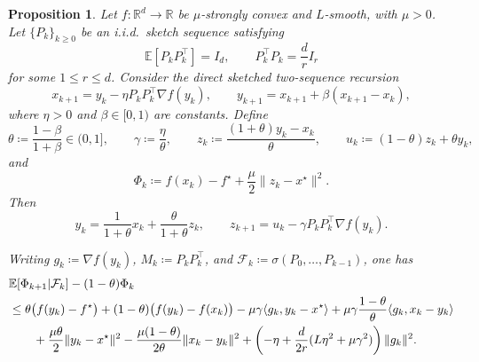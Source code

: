 \documentclass[10pt,a4paper]{amsart}
\newtheorem{proposition}{Proposition}
\begin{document}
\begin{proposition}
\label{prop:strong-two-seq-obstruction-collapse}
Let \(f:\mathbb{R}^d\to\mathbb{R}\) be \(\mu\)-strongly convex and \(L\)-smooth, with \(\mu>0\).
Let \(\{P_k\}_{k\ge 0}\) be an i.i.d.\ sketch sequence satisfying
\[
\mathbb{E}[P_kP_k^\top]=I_d,
\qquad
P_k^\top P_k=\frac{d}{r}I_r
\]
for some \(1\le r\le d\).
Consider the direct sketched two-sequence recursion
\begin{equation}
x_{k+1}=y_k-\eta P_kP_k^\top \nabla f(y_k),
\qquad
y_{k+1}=x_{k+1}+\beta(x_{k+1}-x_k),
\label{eq:strong-direct-two-seq-collapse}
\end{equation}
where \(\eta>0\) and \(\beta\in[0,1)\) are constants. Define
\[
\theta\coloneqq \frac{1-\beta}{1+\beta}\in(0,1],
\qquad
\gamma\coloneqq \frac{\eta}{\theta},
\qquad
z_k\coloneqq \frac{(1+\theta)y_k-x_k}{\theta},
\qquad
u_k\coloneqq (1-\theta)z_k+\theta y_k,
\]
and
\[
\Phi_k\coloneqq f(x_k)-f^\star+\frac{\mu}{2}\|z_k-x^\star\|^2.
\]
Then
\begin{equation}
y_k=\frac{1}{1+\theta}x_k+\frac{\theta}{1+\theta}z_k,
\qquad
z_{k+1}=u_k-\gamma P_kP_k^\top \nabla f(y_k).
\label{eq:strong-hidden-two-seq-collapse}
\end{equation}

Writing \(g_k\coloneqq \nabla f(y_k)\), \(M_k\coloneqq P_kP_k^\top\), and
\(\mathcal F_k\coloneqq \sigma(P_0,\dots,P_{k-1})\), one has
\begin{align}
&\mathbb{E}\!\left[\Phi_{k+1}\middle|\mathcal F_k\right]-(1-\theta)\Phi_k
\notag\\
&\le
\theta\bigl(f(y_k)-f^\star\bigr)
+(1-\theta)\bigl(f(y_k)-f(x_k)\bigr)
-\mu\gamma\langle g_k,y_k-x^\star\rangle
+\mu\gamma\frac{1-\theta}{\theta}\langle g_k,x_k-y_k\rangle
\notag\\
&\qquad
+\frac{\mu\theta}{2}\|y_k-x^\star\|^2
-\frac{\mu(1-\theta)}{2\theta}\|x_k-y_k\|^2
+\left(
-\eta+\frac{d}{2r}(L\eta^2+\mu\gamma^2)
\right)\|g_k\|^2.
\label{eq:strong-precollapse-general}
\end{align}


\end{proposition}
\end{document}
